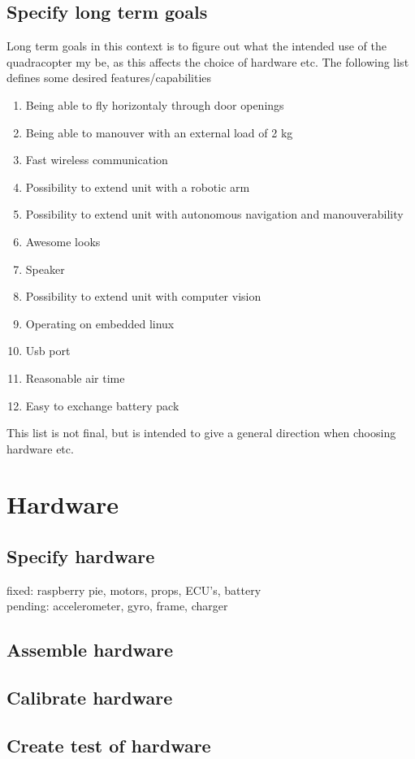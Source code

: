 \documentclass[12pt]{article}
\begin{document}
	\subsection{Specify long term goals}
	Long term goals in this context is to figure out what the intended use of the quadracopter my be, as this affects the choice of hardware etc. The following list defines some desired features/capabilities 
\begin{enumerate}
\item Being able to fly horizontaly through door openings
\item Being able to manouver with an external load of 2 kg
\item Fast wireless communication
\item Possibility to extend unit with a robotic arm
\item Possibility to extend unit with autonomous navigation and manouverability
\item Awesome looks
\item Speaker
\item Possibility to extend unit with computer vision
\item Operating on embedded linux
\item Usb port
\item Reasonable air time
\item Easy to exchange battery pack
\end{enumerate}
This list is not final, but is intended to give a general direction when choosing hardware etc.

\section{Hardware}
	\subsection{Specify hardware}
	fixed: raspberry pie, motors, props, ECU's, battery\\
	pending: accelerometer, gyro, frame, charger
	\subsection{Assemble hardware}
	\subsection{Calibrate hardware}
	\subsection{Create test of hardware}
\end{document}
